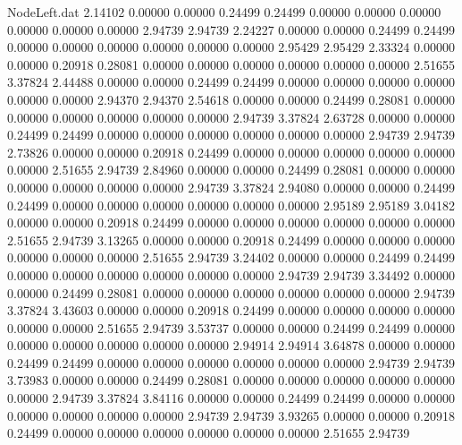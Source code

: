\begin{filecontents}{NodeLeft.dat}
   2.14102    0.00000    0.00000     0.24499    0.24499    0.00000    0.00000    0.00000    0.00000    0.00000    0.00000    2.94739    2.94739
   2.24227    0.00000    0.00000     0.24499    0.24499    0.00000    0.00000    0.00000    0.00000    0.00000    0.00000    2.95429    2.95429
   2.33324    0.00000    0.00000     0.20918    0.28081    0.00000    0.00000    0.00000    0.00000    0.00000    0.00000    2.51655    3.37824
   2.44488    0.00000    0.00000     0.24499    0.24499    0.00000    0.00000    0.00000    0.00000    0.00000    0.00000    2.94370    2.94370
   2.54618    0.00000    0.00000     0.24499    0.28081    0.00000    0.00000    0.00000    0.00000    0.00000    0.00000    2.94739    3.37824
   2.63728    0.00000    0.00000     0.24499    0.24499    0.00000    0.00000    0.00000    0.00000    0.00000    0.00000    2.94739    2.94739
   2.73826    0.00000    0.00000     0.20918    0.24499    0.00000    0.00000    0.00000    0.00000    0.00000    0.00000    2.51655    2.94739
   2.84960    0.00000    0.00000     0.24499    0.28081    0.00000    0.00000    0.00000    0.00000    0.00000    0.00000    2.94739    3.37824
   2.94080    0.00000    0.00000     0.24499    0.24499    0.00000    0.00000    0.00000    0.00000    0.00000    0.00000    2.95189    2.95189
   3.04182    0.00000    0.00000     0.20918    0.24499    0.00000    0.00000    0.00000    0.00000    0.00000    0.00000    2.51655    2.94739
   3.13265    0.00000    0.00000     0.20918    0.24499    0.00000    0.00000    0.00000    0.00000    0.00000    0.00000    2.51655    2.94739
   3.24402    0.00000    0.00000     0.24499    0.24499    0.00000    0.00000    0.00000    0.00000    0.00000    0.00000    2.94739    2.94739
   3.34492    0.00000    0.00000     0.24499    0.28081    0.00000    0.00000    0.00000    0.00000    0.00000    0.00000    2.94739    3.37824
   3.43603    0.00000    0.00000     0.20918    0.24499    0.00000    0.00000    0.00000    0.00000    0.00000    0.00000    2.51655    2.94739
   3.53737    0.00000    0.00000     0.24499    0.24499    0.00000    0.00000    0.00000    0.00000    0.00000    0.00000    2.94914    2.94914
   3.64878    0.00000    0.00000     0.24499    0.24499    0.00000    0.00000    0.00000    0.00000    0.00000    0.00000    2.94739    2.94739
   3.73983    0.00000    0.00000     0.24499    0.28081    0.00000    0.00000    0.00000    0.00000    0.00000    0.00000    2.94739    3.37824
   3.84116    0.00000    0.00000     0.24499    0.24499    0.00000    0.00000    0.00000    0.00000    0.00000    0.00000    2.94739    2.94739
   3.93265    0.00000    0.00000     0.20918    0.24499    0.00000    0.00000    0.00000    0.00000    0.00000    0.00000    2.51655    2.94739

\end{filecontents}
